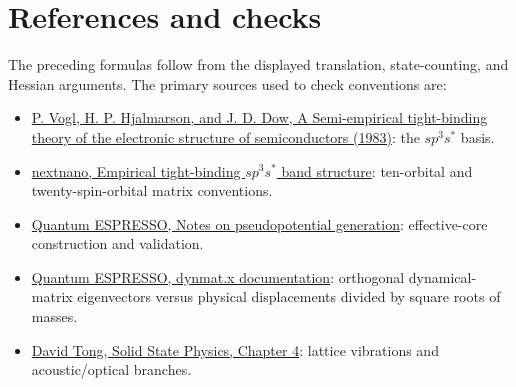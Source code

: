 \section*{References and checks}
The preceding formulas follow from the displayed translation, state-counting, and Hessian arguments. The primary sources used to check conventions are:
\begin{itemize}
\item \href{https://www.sciencedirect.com/science/article/pii/0022369783900641}{P. Vogl, H. P. Hjalmarson, and J. D. Dow, A Semi-empirical tight-binding theory of the electronic structure of semiconductors (1983)}: the $sp^3s^*$ basis.
\item \href{https://www.nextnano.com/docu/nextnano3/tutorials/1D_TightBinding_bulk.html}{nextnano, Empirical tight-binding $sp^3s^*$ band structure}: ten-orbital and twenty-spin-orbital matrix conventions.
\item \href{https://www.quantum-espresso.org/wp-content/uploads/2022/03/pseudo-gen.pdf}{Quantum ESPRESSO, Notes on pseudopotential generation}: effective-core construction and validation.
\item \href{https://www.quantum-espresso.org/Doc/INPUT_DYNMAT.html}{Quantum ESPRESSO, dynmat.x documentation}: orthogonal dynamical-matrix eigenvectors versus physical displacements divided by square roots of masses.
\item \href{https://davidtong.org/pdfs/teaching/solid-state-physics/solidstate4.pdf}{David Tong, Solid State Physics, Chapter 4}: lattice vibrations and acoustic/optical branches.
\end{itemize}
